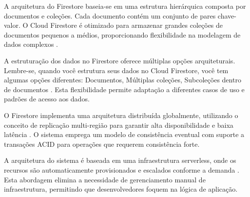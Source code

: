 A arquitetura do Firestore baseia-se em uma estrutura hierárquica composta por documentos e coleções. Cada documento contém um conjunto de pares chave-valor. O Cloud Firestore é otimizado para armazenar grandes coleções de documentos pequenos a médios, proporcionando flexibilidade na modelagem de dados complexos \cite{firebase_data_model}.

A estruturação dos dados no Firestore oferece múltiplas opções arquiteturais. Lembre-se, quando você estrutura seus dados no Cloud Firestore, você tem algumas opções diferentes: Documentos, Múltiplas coleções, Subcoleções dentro de documentos \cite{firebase_data_model}. Esta flexibilidade permite adaptação a diferentes casos de uso e padrões de acesso aos dados.

O Firestore implementa uma arquitetura distribuída globalmente, utilizando o conceito de replicação multi-região para garantir alta disponibilidade e baixa latência \cite{firebase_firestore_docs}. O sistema emprega um modelo de consistência eventual com suporte a transações ACID para operações que requerem consistência forte.

A arquitetura do sistema é baseada em uma infraestrutura serverless, onde os recursos são automaticamente provisionados e escalados conforme a demanda \cite{medium_firestore_overview}. Esta abordagem elimina a necessidade de gerenciamento manual de infraestrutura, permitindo que desenvolvedores foquem na lógica de aplicação.

\begin{comment}
O Firebase Firestore constitui-se como um banco de dados NoSQL (Not Only SQL) orientado a documentos, desenvolvido e mantido pela Google como componente central do ecossistema Firebase \cite{google2023firestore}. Esta solução de armazenamento fundamenta-se em uma arquitetura distribuída e escalável, projetada especificamente para atender às demandas de aplicações móveis e web modernas que requerem sincronização de dados em tempo real entre múltiplos clientes e dispositivos \cite{chang2008bigtable}.

A arquitetura do Firestore baseia-se no modelo de dados orientado a documentos, onde as informações são organizadas em estruturas hierárquicas compostas por coleções e documentos \cite{mongodb2023nosql}. Cada documento representa uma unidade de dados estruturada em formato JSON, contendo pares chave-valor que podem incluir tipos primitivos, arrays, objetos aninhados e referências a outros documentos. Esta flexibilidade estrutural permite a modelagem eficiente de dados complexos sem as restrições impostas pelos esquemas rígidos dos bancos de dados relacionais tradicionais.

\end{comment}

